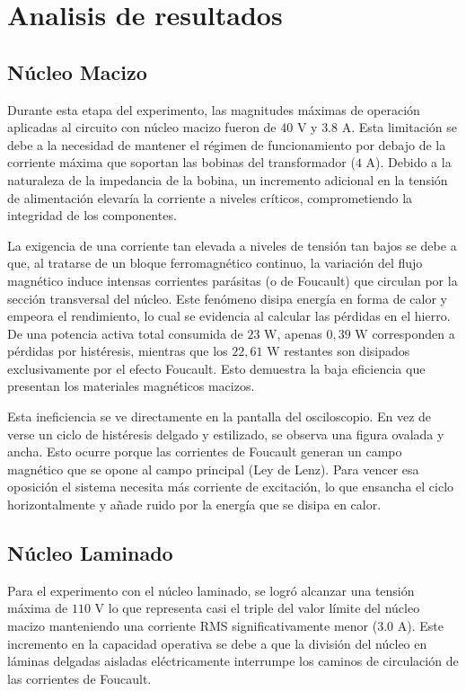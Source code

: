 \pagebreak
\section{Analisis de resultados}

\subsection{Núcleo Macizo}

Durante esta etapa del experimento, las magnitudes máximas de operación aplicadas al circuito con núcleo macizo fueron de $40\text{ V}$ y $3.8\text{ A}$. Esta limitación se debe a la necesidad de mantener el régimen de funcionamiento por debajo de la corriente máxima que soportan las bobinas del transformador ($4\text{ A}$). Debido a la naturaleza de la impedancia de la bobina, un incremento adicional en la tensión de alimentación elevaría la corriente a niveles críticos, comprometiendo la integridad de los componentes. 

La exigencia de una corriente tan elevada a niveles de tensión tan bajos se debe a que, al tratarse de un bloque ferromagnético continuo, la variación del flujo magnético induce intensas corrientes parásitas (o de Foucault) que circulan por la sección transversal del núcleo. Este fenómeno disipa energía en forma de calor y empeora el rendimiento, lo cual se evidencia al calcular las pérdidas en el hierro. De una potencia activa total consumida de $23\text{ W}$, apenas $0,39\text{ W}$ corresponden a pérdidas por histéresis, mientras que los $22,61\text{ W}$ restantes son disipados exclusivamente por el efecto Foucault. Esto demuestra la baja eficiencia que presentan los materiales magnéticos macizos.

Esta ineficiencia se ve directamente en la pantalla del osciloscopio. En vez de verse un ciclo de histéresis delgado y estilizado, se observa una figura ovalada y ancha. Esto ocurre porque las corrientes de Foucault generan un campo magnético que se opone al campo principal (Ley de Lenz). Para vencer esa oposición el sistema necesita más corriente de excitación, lo que ensancha el ciclo horizontalmente y añade ruido por la energía que se disipa en calor.

\subsection{Núcleo Laminado}

Para el experimento con el núcleo laminado, se logró alcanzar una tensión máxima de $110\text{ V}$ lo que representa casi el triple del valor límite del núcleo macizo manteniendo una corriente RMS significativamente menor ($3.0 \text{ A}$). Este incremento en la capacidad operativa se debe a que la división del núcleo en láminas delgadas aisladas eléctricamente interrumpe los caminos de circulación de las corrientes de Foucault. 

